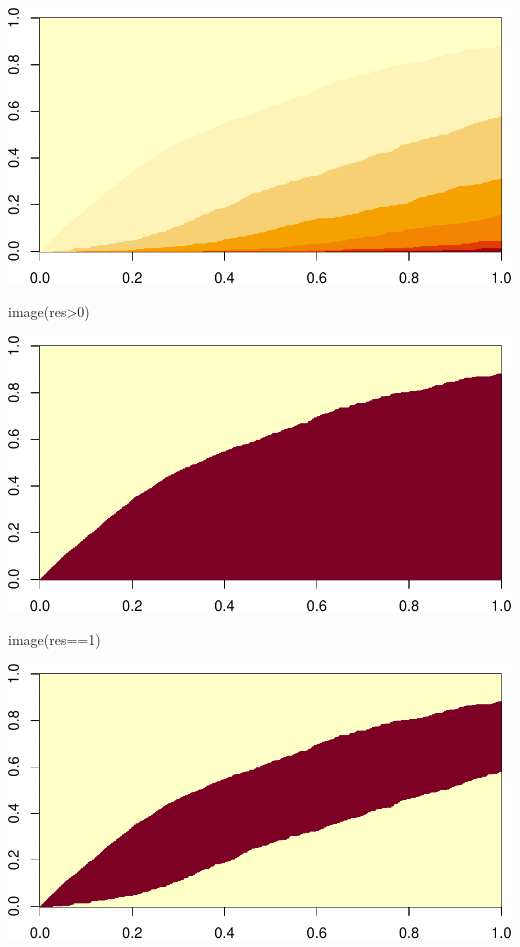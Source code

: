 \documentclass[
]{article}
\newenvironment{Shaded}{\begin{snugshade}}{\end{snugshade}}
\newcommand{\DecValTok}[1]{\textcolor[rgb]{0.00,0.00,0.81}{#1}}
\newcommand{\FunctionTok}[1]{\textcolor[rgb]{0.00,0.00,0.00}{#1}}
\newcommand{\NormalTok}[1]{#1}
\newcommand{\SpecialCharTok}[1]{\textcolor[rgb]{0.00,0.00,0.00}{#1}}
\begin{document}
\includegraphics{examples_files/figure-latex/unnamed-chunk-4-1.pdf}

\begin{Shaded}
\begin{Highlighting}[]
\FunctionTok{image}\NormalTok{(res}\SpecialCharTok{\textgreater{}}\DecValTok{0}\NormalTok{)}
\end{Highlighting}
\end{Shaded}

\includegraphics{examples_files/figure-latex/unnamed-chunk-4-2.pdf}

\begin{Shaded}
\begin{Highlighting}[]
\FunctionTok{image}\NormalTok{(res}\SpecialCharTok{==}\DecValTok{1}\NormalTok{)}
\end{Highlighting}
\end{Shaded}

\includegraphics{examples_files/figure-latex/unnamed-chunk-4-3.pdf}
\end{document}
